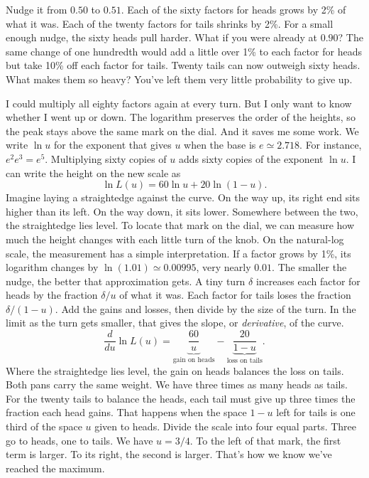 Nudge it from $0.50$ to $0.51$. Each of the sixty factors for heads grows by 2\% of what it was. Each of the twenty factors for tails shrinks by 2\%. For a small enough nudge, the sixty heads pull harder. What if you were already at $0.90$? The same change of one hundredth would add a little over 1\% to each factor for heads but take 10\% off each factor for tails. Twenty tails can now outweigh sixty heads. What makes them so heavy? You've left them very little probability to give up.

I could multiply all eighty factors again at every turn. But I only want to know whether I went up or down. The logarithm preserves the order of the heights, so the peak stays above the same mark on the dial. And it saves me some work. We write $\ln u$ for the exponent that gives $u$ when the base is $e\simeq2.718$. For instance, $e^2e^3=e^5$. Multiplying sixty copies of $u$ adds sixty copies of the exponent $\ln u$. I can write the height on the new scale as
\[
              \ln L(u)=60\ln u+20\ln(1-u).
\]
Imagine laying a straightedge against the curve. On the way up, its right end sits higher than its left. On the way down, it sits lower. Somewhere between the two, the straightedge lies level. To locate that mark on the dial, we can measure how much the height changes with each little turn of the knob. On the natural-log scale, the measurement has a simple interpretation. If a factor grows by 1\%, its logarithm changes by $\ln(1.01)\simeq0.00995$, very nearly $0.01$. The smaller the nudge, the better that approximation gets. A tiny turn $\delta$ increases each factor for heads by the fraction $\delta/u$ of what it was. Each factor for tails loses the fraction $\delta/(1-u)$. Add the gains and losses, then divide by the size of the turn. In the limit as the turn gets smaller, that gives the slope, or \emph{derivative}, of the curve.
\[
 \frac{d}{du}\ln L(u)
   =\underbrace{\frac{60}{u}}_{\text{gain on heads}}
    -\underbrace{\frac{20}{1-u}}_{\text{loss on tails}}.
\]
Where the straightedge lies level, the gain on heads balances the loss on tails. Both pans carry the same weight. We have three times as many heads as tails. For the twenty tails to balance the heads, each tail must give up three times the fraction each head gains. That happens when the space $1-u$ left for tails is one third of the space $u$ given to heads. Divide the scale into four equal parts. Three go to heads, one to tails. We have $u=3/4$. To the left of that mark, the first term is larger. To its right, the second is larger. That's how we know we've reached the maximum.

